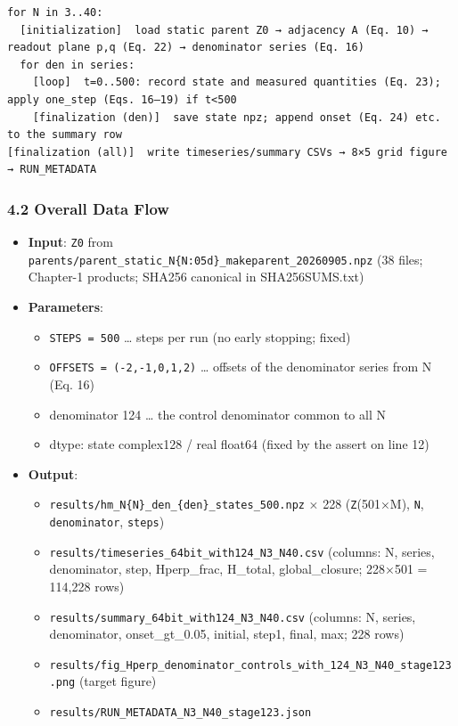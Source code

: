 \documentclass[
  a4paper,
]{ltjsarticle}
\providecommand{\tightlist}{%
  \setlength{\itemsep}{0pt}\setlength{\parskip}{0pt}}
\begin{document}
\begin{verbatim}
for N in 3..40:
  [initialization]  load static parent Z0 → adjacency A (Eq. 10) → readout plane p,q (Eq. 22) → denominator series (Eq. 16)
  for den in series:
    [loop]  t=0..500: record state and measured quantities (Eq. 23); apply one_step (Eqs. 16–19) if t<500
    [finalization (den)]  save state npz; append onset (Eq. 24) etc. to the summary row
[finalization (all)]  write timeseries/summary CSVs → 8×5 grid figure → RUN_METADATA
\end{verbatim}

\subsubsection{4.2 Overall Data Flow}\label{overall-data-flow}

\begin{itemize}
\tightlist
\item
  \textbf{Input}: \texttt{Z0} from
  \texttt{parents/parent\_static\_N\{N:05d\}\_makeparent\_20260905.npz}
  (38 files; Chapter-1 products; SHA256 canonical in SHA256SUMS.txt)
\item
  \textbf{Parameters}:

  \begin{itemize}
  \tightlist
  \item
    \texttt{STEPS\ =\ 500} \ldots{} steps per run (no early stopping;
    fixed)
  \item
    \texttt{OFFSETS\ =\ (-2,-1,0,1,2)} \ldots{} offsets of the
    denominator series from N (Eq. 16)
  \item
    denominator 124 \ldots{} the control denominator common to all N
  \item
    dtype: state complex128 / real float64 (fixed by the assert on line
    12)
  \end{itemize}
\item
  \textbf{Output}:

  \begin{itemize}
  \tightlist
  \item
    \texttt{results/hm\_N\{N\}\_den\_\{den\}\_states\_500.npz} × 228
    (\texttt{Z}(501×M), \texttt{N}, \texttt{denominator},
    \texttt{steps})
  \item
    \texttt{results/timeseries\_64bit\_with124\_N3\_N40.csv} (columns:
    N, series, denominator, step, Hperp\_frac, H\_total,
    global\_closure; 228×501 = 114,228 rows)
  \item
    \texttt{results/summary\_64bit\_with124\_N3\_N40.csv} (columns: N,
    series, denominator, onset\_gt\_0.05, initial, step1, final, max;
    228 rows)
  \item
    \texttt{results/fig\_Hperp\_denominator\_controls\_with\_124\_N3\_N40\_stage123.png}
    (target figure)
  \item
    \texttt{results/RUN\_METADATA\_N3\_N40\_stage123.json}
  \end{itemize}
\end{itemize}
\end{document}
